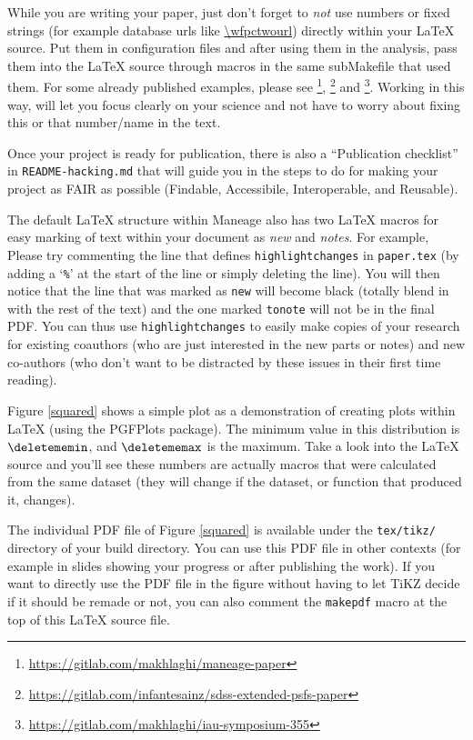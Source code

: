 \documentclass[10pt, twocolumn]{article}
\begin{document}
While you are writing your paper, just don't forget to \emph{not} use
numbers or fixed strings (for example database urls like \url{\wfpctwourl})
directly within your \LaTeX{} source. Put them in configuration files and
after using them in the analysis, pass them into the \LaTeX{} source
through macros in the same subMakefile that used them. For some already
published examples, please see
\citet{maneage}\footnote{\url{https://gitlab.com/makhlaghi/maneage-paper}},
\citet{infantesainz20}\footnote{\url{https://gitlab.com/infantesainz/sdss-extended-psfs-paper}}
and
\citet{akhlaghi19}\footnote{\url{https://gitlab.com/makhlaghi/iau-symposium-355}}. Working
in this way, will let you focus clearly on your science and not have to
worry about fixing this or that number/name in the text.

Once your project is ready for publication, there is also a ``Publication
checklist'' in \texttt{README-hacking.md} that will guide you in the steps
to do for making your project as FAIR as possible (Findable, Accessibile,
Interoperable, and Reusable).

The default \LaTeX{} structure within Maneage also has two \LaTeX{} macros
for easy marking of text within your document as \emph{new} and
\emph{notes}. For example, 
 Please try commenting
the line that defines \texttt{highlightchanges} in \texttt{paper.tex} (by
adding a `\texttt{\%}' at the start of the line or simply deleting the
line). You will then notice that the line that was marked as \texttt{new}
will become black (totally blend in with the rest of the text) and the one
marked \texttt{tonote} will not be in the final PDF. You can thus use
\texttt{highlightchanges} to easily make copies of your research for
existing coauthors (who are just interested in the new parts or notes) and
new co-authors (who don't want to be distracted by these issues in their
first time reading).

Figure \ref{squared} shows a simple plot as a demonstration of creating
plots within \LaTeX{} (using the {\small PGFP}lots package). The minimum
value in this distribution is $\deletememin$, and $\deletememax$ is the
maximum. Take a look into the \LaTeX{} source and you'll see these numbers
are actually macros that were calculated from the same dataset (they will
change if the dataset, or function that produced it, changes).

The individual {\small PDF} file of Figure \ref{squared} is available under
the \texttt{tex/tikz/} directory of your build directory. You can use this
PDF file in other contexts (for example in slides showing your progress or
after publishing the work). If you want to directly use the {\small PDF}
file in the figure without having to let {\small T}i{\small KZ} decide if
it should be remade or not, you can also comment the \texttt{makepdf} macro
at the top of this \LaTeX{} source file.
\end{document}
